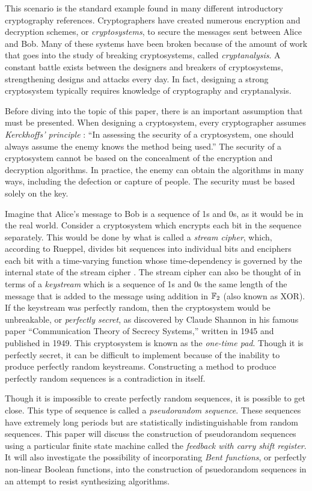 \par This scenario is the standard example found in many different
introductory cryptography references. Cryptographers have created numerous
encryption and decryption schemes, or {\em cryptosystems}, to secure the
messages sent between Alice and Bob. Many of these systems have been broken
because of the amount of work that goes into the study of breaking
cryptosystems, called {\em cryptanalysis}. A constant battle exists between
the designers and breakers of cryptosystems, strengthening designs and
attacks every day. In fact, designing a strong cryptosystem typically
requires knowledge of cryptography and cryptanalysis.

\par Before diving into the topic of this paper, there is an important
assumption that must be presented. When designing a cryptosystem, every
cryptographer assumes {\em Kerckhoffs' principle} \cite{bk:tw06}: ``In
assessing the security of a cryptosystem, one should always assume the enemy
knows the method being used.'' The security of a cryptosystem cannot be
based on the concealment of the encryption and decryption algorithms. In
practice, the enemy can obtain the algorithms in many ways, including the
defection or capture of people. The security must be based solely on the
key.

\par Imagine that Alice's message to Bob is a sequence of 1s and 0s, as it
would be in the real world. Consider a cryptosystem which encrypts each bit
in the sequence separately. This would be done by what is called a
{\em stream cipher}, which, according to Rueppel, divides bit sequences into
individual bits and enciphers each bit with a time-varying function whose
time-dependency is governed by the internal state of the stream cipher
\cite{bk:r86}. The stream cipher can also be thought of in terms of a
{\em keystream} which is a sequence of 1s and 0s the same length of the
message that is added to the message using addition in $\mathbb{F}_2$ (also known
as XOR). If the keystream was perfectly random, then the cryptosystem would
be unbreakable, or {\em perfectly secret}, as discovered by Claude Shannon
in his famous paper ``Communication Theory of Secrecy Systems,'' written in
1945 and published in 1949. This cryptosystem is known as the {\em one-time
pad}. Though it is perfectly secret, it can be difficult to implement
because of the inability to produce perfectly random keystreams.
Constructing a method to produce perfectly random sequences is a
contradiction in itself.

\par Though it is impossible to create perfectly random sequences, it is
possible to get close. This type of sequence is called a {\em pseudorandom
sequence}. These sequences have extremely long periods but are statistically
indistinguishable from random sequences. This paper will discuss the
construction of pseudorandom sequences using a particular finite state
machine called the {\em feedback with carry shift register}. It will also
investigate the possibility of incorporating {\em Bent functions}, or
perfectly non-linear Boolean functions, into the construction of
psuedorandom sequences in an attempt to resist synthesizing algorithms. 
